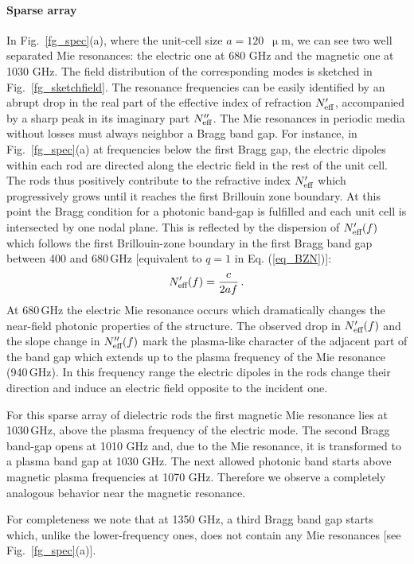 \documentclass[letterpaper,12pt]{report}
\begin{document}
\paragraph{Sparse array}
In Fig.~\ref{fg_spec}(a), where the unit-cell size $a=120$~$\upmu$m, we can see two well
separated Mie resonances: the electric one at 680 GHz and the magnetic one at 1030 GHz.
The field distribution of the corresponding modes is sketched in
Fig.~\ref{fg_sketchfield}. The resonance frequencies can be easily identified by an
abrupt drop in the real part of the effective index of refraction $N_{\text{eff} }'$, accompanied
by a sharp peak in its imaginary part $N_{\text{eff} }''$. The Mie resonances in periodic media
without losses must always neighbor a Bragg band gap. For instance, in
Fig.~\ref{fg_spec}(a) at frequencies below the first Bragg gap, the electric dipoles
within each rod are directed along the electric field in the rest of the unit
cell. The rods thus positively contribute to the refractive index $N_{\text{eff} }'$ which
progressively grows until it reaches the first Brillouin zone boundary. At this point the
Bragg condition for a photonic band-gap is fulfilled and each unit cell is intersected by
one nodal plane. This is reflected by the dispersion of $N_{\text{eff} }'(f)$ which follows the
first Brillouin-zone boundary in the first Bragg band gap between 400 and 680\,GHz [equivalent to $q=1$ in Eq. (\ref{eq_BZN})]:
$$	N_{\text{eff} }'(f) = \frac{c}{2af}\,. $$
At 680\,GHz the electric Mie resonance occurs which dramatically changes the near-field
photonic properties of the structure. The observed drop in $N_{\text{eff} }'(f)$ and the slope change
in $N_{\text{eff} }''(f)$ mark the plasma-like character of the adjacent part of the band gap which
extends up to the plasma frequency of the Mie resonance (940\,GHz). In this frequency
range the electric dipoles in the rods change their direction and induce an electric field
opposite to the incident one.

For this sparse array of dielectric rods the first magnetic Mie resonance lies at
1030\,GHz, above the plasma frequency of the electric mode. 
The second Bragg band-gap opens at 1010 GHz and, due to the Mie resonance, it is transformed to a plasma band gap at 1030 GHz. The next allowed photonic band starts above magnetic plasma frequencies at 1070 GHz.
Therefore we observe a completely analogous behavior near the magnetic resonance. 

For completeness we note that at 1350 GHz, a third Bragg band gap
starts which, unlike the lower-frequency ones, does not contain any Mie resonances 
[see Fig.\ \ref{fg_spec}(a)].
\end{document}
